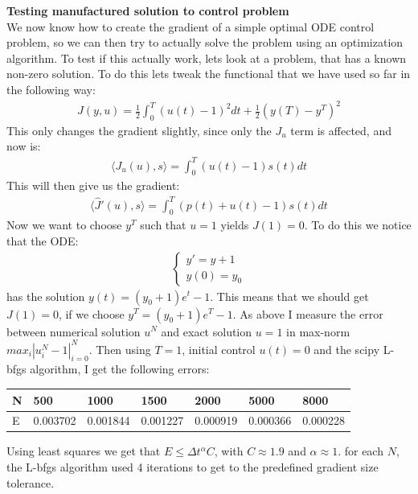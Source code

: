 \documentclass[11pt,a4paper]{report}
\begin{document}
\textbf{Testing manufactured solution to control problem}
\\
We now know how to create the gradient of a simple optimal ODE control problem, so we can then try to actually solve the problem using an optimization algorithm. To test if this actually work, lets look at a problem, that has a known non-zero solution. To do this lets tweak the functional that we have used so far in the following way:
\begin{align*}
J(y,u) = \frac{1}{2}\int_0^T(u(t)-1)^2dt + \frac{1}{2}(y(T)-y^T)^2
\end{align*}
This only changes the gradient slightly, since only the $J_u$ term is affected, and now is:
\begin{align*}
\langle J_u(u),s\rangle = \int_0^T (u(t)-1)s(t) dt
\end{align*}
This will then give us the gradient:
\begin{align*}
\langle\hat{J}'(u),s\rangle = \int_0^T(p(t)+u(t)-1)s(t)dt
\end{align*}
Now we want to choose $y^T$ such that $u=1$ yields $J(1)=0$. To do this we notice that the ODE:
\begin{align*}
\left\{
     \begin{array}{lr}
       	y' =  y +1\\
       	   y(0)=y_0
     \end{array}
   \right.
\end{align*}
has the solution $y(t)=(y_0+1)e^t -1$. This means that we should get $J(1)=0$, if we choose $y^T =  (y_0+1)e^T -1$. As above I measure the error between numerical solution $u^N$ and exact solution $u=1$ in max-norm $max_i{|u^N_i-1|}_{i=0}^N$. Then using $T=1$, initial control $u(t)=0$ and the scipy L-bfgs algorithm, I get the following errors:
\begin{center}
    \begin{tabular}{| l | l | l | l | l | l | l |}
    \hline
    N & 500 & 1000  & 1500 & 2000 & 5000 & 8000 \\ \hline
    E & 0.003702 & 0.001844 &0.001227 & 0.000919 & 0.000366 & 0.000228	\\ \hline
    \end{tabular}
\end{center}
Using least squares we get that $E\leq \Delta t^{\alpha}C$, with $C\approx 1.9$ and $\alpha\approx1$. for each $N$, the L-bfgs algorithm used 4 iterations to get to the predefined gradient size tolerance.
\\
\\
\end{document}
